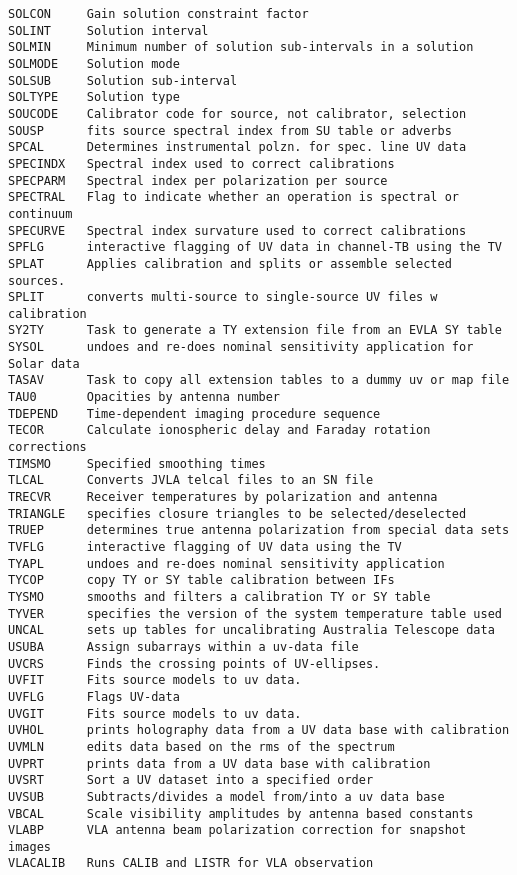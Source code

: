 \begin{verbatim}
SOLCON     Gain solution constraint factor
SOLINT     Solution interval
SOLMIN     Minimum number of solution sub-intervals in a solution
SOLMODE    Solution mode
SOLSUB     Solution sub-interval
SOLTYPE    Solution type
SOUCODE    Calibrator code for source, not calibrator, selection
SOUSP      fits source spectral index from SU table or adverbs
SPCAL      Determines instrumental polzn. for spec. line UV data
SPECINDX   Spectral index used to correct calibrations
SPECPARM   Spectral index per polarization per source
SPECTRAL   Flag to indicate whether an operation is spectral or continuum
SPECURVE   Spectral index survature used to correct calibrations
SPFLG      interactive flagging of UV data in channel-TB using the TV
SPLAT      Applies calibration and splits or assemble selected sources.
SPLIT      converts multi-source to single-source UV files w calibration
SY2TY      Task to generate a TY extension file from an EVLA SY table
SYSOL      undoes and re-does nominal sensitivity application for Solar data
TASAV      Task to copy all extension tables to a dummy uv or map file
TAU0       Opacities by antenna number
TDEPEND    Time-dependent imaging procedure sequence
TECOR      Calculate ionospheric delay and Faraday rotation corrections
TIMSMO     Specified smoothing times
TLCAL      Converts JVLA telcal files to an SN file
TRECVR     Receiver temperatures by polarization and antenna
TRIANGLE   specifies closure triangles to be selected/deselected
TRUEP      determines true antenna polarization from special data sets
TVFLG      interactive flagging of UV data using the TV
TYAPL      undoes and re-does nominal sensitivity application
TYCOP      copy TY or SY table calibration between IFs
TYSMO      smooths and filters a calibration TY or SY table
TYVER      specifies the version of the system temperature table used
UNCAL      sets up tables for uncalibrating Australia Telescope data
USUBA      Assign subarrays within a uv-data file
UVCRS      Finds the crossing points of UV-ellipses.
UVFIT      Fits source models to uv data.
UVFLG      Flags UV-data
UVGIT      Fits source models to uv data.
UVHOL      prints holography data from a UV data base with calibration
UVMLN      edits data based on the rms of the spectrum
UVPRT      prints data from a UV data base with calibration
UVSRT      Sort a UV dataset into a specified order
UVSUB      Subtracts/divides a model from/into a uv data base
VBCAL      Scale visibility amplitudes by antenna based constants
VLABP      VLA antenna beam polarization correction for snapshot images
VLACALIB   Runs CALIB and LISTR for VLA observation

\end{verbatim}
